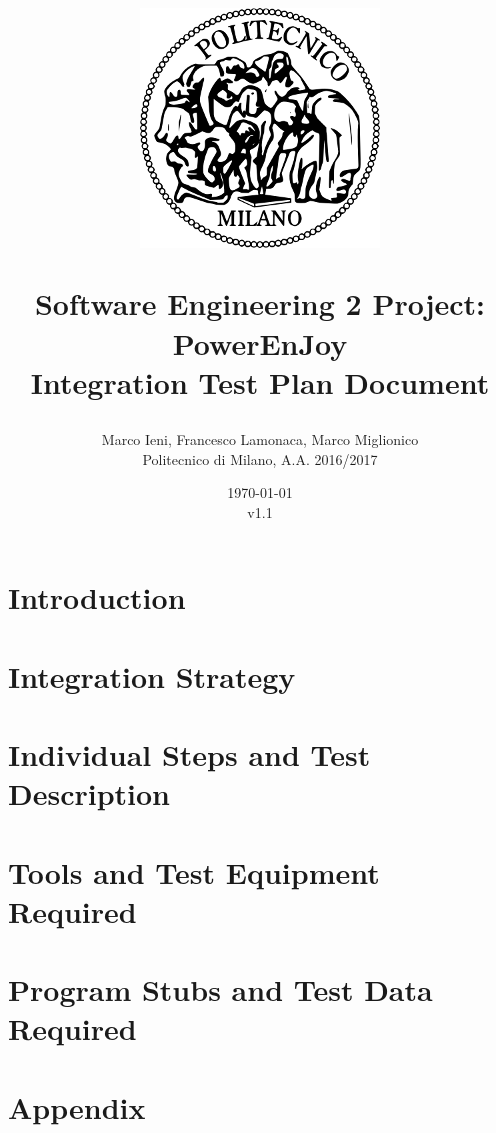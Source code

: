 \documentclass[a4paper, 12pt]{report}
\title{
	\begin{figure}[h]
		\centering
		\includegraphics{../common_resources/logo_polimi.png}
	\end{figure}
	\vspace{30px}
	Software Engineering 2 Project: PowerEnJoy \\ \vspace{1em}
	\textbf{I}ntegration \textbf{T}est \textbf{P}lan \textbf{D}ocument
}
\author{Marco Ieni, Francesco Lamonaca, Marco Miglionico\\Politecnico di Milano, A.A. 2016/2017}
\date{\today\\v1.1}
\begin{document}
\maketitle
\tableofcontents

\chapter{Introduction}
\label{ch:introduction}
%




\chapter{Integration Strategy}
\label{ch:integration_strategy}





\chapter{Individual Steps and Test Description}
\label{ch:individual_steps}













\chapter{Tools and Test Equipment Required}
\label{ch:tools}



\chapter{Program Stubs and Test Data Required}
\label{ch:program_stubs}





\appendix
\chapter{Appendix}

\end{document}
